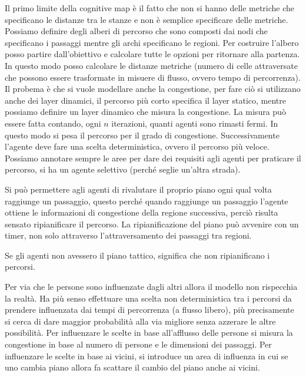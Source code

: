 Il primo limite della cognitive map è il fatto che non si hanno delle metriche 
che specificano le distanze tra le stanze e non è semplice specificare delle metriche.
Possiamo definire degli alberi di percorso che sono composti dai nodi che specificano
i passaggi mentre gli archi specificano le regioni. Per costruire l'albero posso 
partire dall'obiettivo e calcolare tutte le opzioni per ritornare alla partenza. 
In questo modo posso calcolare le distanze metriche (numero di celle 
attraversate che possono essere trasformate in misuere di flusso, ovvero tempo 
di percorrenza). Il probema è che si vuole modellare anche la congestione, 
per fare ciò si utilizzano anche dei layer dinamici, il percorso più corto specifica 
il layer statico, mentre possiamo definire un layer dinamico che misura la congestione.
La misura può essere fatta contando, ogni $n$ iterazioni, quanti agenti sono rimasti 
fermi. In questo modo si pesa il percorso per il grado di congestione. Successivamente 
l'agente deve fare una scelta deterministica, ovvero il percorso più veloce.
Possiamo annotare sempre le aree per dare dei requisiti agli agenti per praticare 
il percorso, si ha un agente selettivo (perché seglie un'altra strada). 

Si può permettere agli agenti di rivalutare il proprio piano ogni qual volta raggiunge
un passaggio, questo perché quando raggiunge un passaggio l'agente ottiene le informazioni
di congestione della regione successiva, perciò risulta sensato ripianificare 
il percorso. La ripianificazione del piano può avvenire con un timer, non solo 
attraverso l'attraversamento dei passaggi tra regioni.

\begin{nota}
    Se gli agenti non avessero il piano tattico, significa che non ripianificano
    i percorsi.
\end{nota}

Per via che le persone sono influenzate dagli altri allora il modello non rispecchia
la realtà. Ha più senso effettuare una scelta non deterministica tra i percorsi 
da prendere influenzata dai tempi di percorrenza (a flusso libero), più precisamente 
si cerca di dare maggior probabilità alla via migliore senza azzerare le altre possibilità.
Per influenzare le scelte in base all'afflusso delle persone si misura la congestione 
in base al numero di persone e le dimensioni dei passaggi.
Per influenzare le scelte in base ai vicini, si introduce un area di influenza 
in cui se uno cambia piano allora fa scattare il cambio del piano anche ai vicini.

